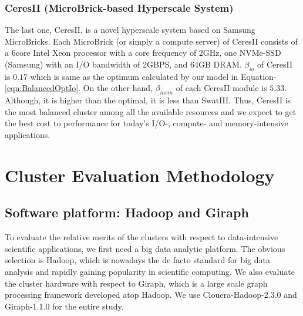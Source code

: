 \documentclass[journal]{IEEEtran}
\begin{document}
\subsubsection{CeresII (MicroBrick-based Hyperscale System)}
The last one, CeresII, is a novel hyperscale system based on Samsung MicroBricks. Each MicroBrick (or simply a compute server) of CeresII consists of a 6core Intel Xeon processor with a core frequency of 2GHz, one NVMe-SSD (Samsung) with an I/O bandwidth of 2GBPS, and 64GB DRAM. $\beta
_{io}$ of CeresII is $0.17$ which is same as the optimum calculated by our model in Equation-\ref{eqn:BalancedOptIo}.  On the other hand, $\beta_{mem}$ of each CeresII module is $5.33$. Although, it is higher than the optimal, it is less than SwatIII. Thus, CeresII is the most balanced cluster among all the available resources and we expect to get the best cost to performance for today's I/O-, compute- and memory-intensive applications. 

\section{Cluster Evaluation Methodology} \label{sec:EvalMethod}

\subsection{Software platform: Hadoop and Giraph}
To evaluate the relative merits of the clusters with respect to data-intensive scientific applications, we first need a big data analytic platform. The obvious selection is Hadoop, which is nowadays the de facto standard for big data analysis and rapidly gaining popularity in scientific computing. We also evaluate the cluster hardware with respect to Giraph, which is a large scale graph processing framework developed atop Hadoop. We use Clouera-Hadoop-2.3.0 and Giraph-1.1.0 for the entire study. 
\end{document}
